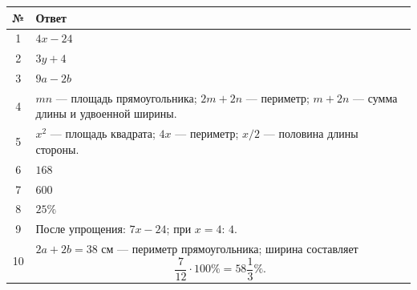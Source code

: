 \documentclass[a4paper,12pt]{article}
\begin{document}
\begin{center}
\begin{tabularx}{\linewidth}{@{}c X@{}}
\toprule
\textbf{№} & \textbf{Ответ} \\
\midrule

1 &
$4x-24$
\\

2 &
$3y+4$
\\

3 &
$9a-2b$
\\

4 &
$mn$ --- площадь прямоугольника;
$2m+2n$ --- периметр;
$m+2n$ --- сумма длины и удвоенной ширины.
\\

5 &
$x^2$ --- площадь квадрата;
$4x$ --- периметр;
$x/2$ --- половина длины стороны.
\\

6 &
$168$
\\

7 &
$600$
\\

8 &
$25\%$
\\

9 &
После упрощения:
$7x-24$;
при $x=4$:
$4$.
\\

10 &
$2a+2b=38$ см --- периметр прямоугольника;
ширина составляет
\[
\frac{7}{12}\cdot100\%
=
58\frac{1}{3}\%.
\]
\\

\bottomrule
\end{tabularx}
\end{center}
\end{document}
